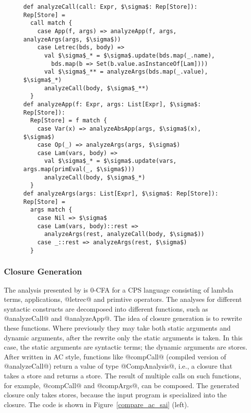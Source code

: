 \begin{figure*}
\begin{subfigure}[h]{0.49\textwidth}
\begin{lstlisting}
def analyzeCall(call: Expr, $\sigma$: Rep[Store]): Rep[Store] = 
  call match {
    case App(f, args) => analyzeApp(f, args, analyzeArgs(args, $\sigma$))
    case Letrec(bds, body) =>
      val $\sigma$_* = $\sigma$.update(bds.map(_.name), 
        bds.map(b => Set(b.value.asInstanceOf[Lam])))
      val $\sigma$_** = analyzeArgs(bds.map(_.value), $\sigma$_*)
      analyzeCall(body, $\sigma$_**)
  }
def analyzeApp(f: Expr, args: List[Expr], $\sigma$: Rep[Store]): 
  Rep[Store] = f match {
    case Var(x) => analyzeAbsApp(args, $\sigma$(x), $\sigma$)
    case Op(_) => analyzeArgs(args, $\sigma$)
    case Lam(vars, body) =>
      val $\sigma$_* = $\sigma$.update(vars, args.map(primEval(_, $\sigma$)))
      analyzeCall(body, $\sigma$_*)
  }
def analyzeArgs(args: List[Expr], $\sigma$: Rep[Store]): Rep[Store] = 
  args match {
    case Nil => $\sigma$
    case Lam(vars, body)::rest => 
      analyzeArgs(rest, analyzeCall(body, $\sigma$))
    case _::rest => analyzeArgs(rest, $\sigma$)
  }
  \end{lstlisting}

  \end{subfigure}
  \caption{Comparison of AC (left) and SAI (right). Only core code are shown.}
  \label{compare_ac_sai}
\end{figure*}

\subsubsection{Closure Generation}

The analysis presented by \citeauthor{Boucher:1996:ACN:647473.727587} is 0-CFA
for a CPS language consisting of lambda terms, applications, @letrec@ and
primtive operators. The analyses for different syntactic constructs are
decomposed into different functions, such as @analyzeCall@ and @analyzeApp@. The
idea of closure generation is to rewrite these functions. Where previously they
may take both static arguments and dynamic arguments, after the rewrite only the
static arguments is taken. In this case, the static arguments are syntactic
terms; the dynamic arguments are stores. After written in AC style, functions
like @compCall@ (compiled version of @analyzeCall@) return a value of type
@CompAnalysis@, i.e., a closure that takes a store and returns a store. The
result of multiple calls on such functions, for example, @compCall@ and
@compArgs@, can be composed. The generated closure only takes stores, because
the input program is specialized into the closure. The code is shown in
Figure~\ref{compare_ac_sai} (left).

